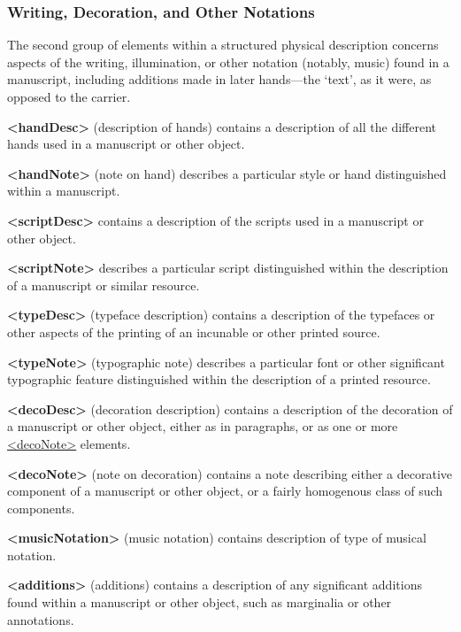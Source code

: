 \subsubsection[{Writing, Decoration, and Other Notations}]{Writing, Decoration, and Other Notations}\label{msph2}\par
The second group of elements within a structured physical description concerns aspects of the writing, illumination, or other notation (notably, music) found in a manuscript, including additions made in later hands—the ‘text’, as it were, as opposed to the carrier. 
\begin{sansreflist}
  
\item [\textbf{<handDesc>}] (description of hands) contains a description of all the different hands used in a manuscript or other object.
\item [\textbf{<handNote>}] (note on hand) describes a particular style or hand distinguished within a manuscript.
\item [\textbf{<scriptDesc>}] contains a description of the scripts used in a manuscript or other object.
\item [\textbf{<scriptNote>}] describes a particular script distinguished within the description of a manuscript or similar resource.
\item [\textbf{<typeDesc>}] (typeface description) contains a description of the typefaces or other aspects of the printing of an incunable or other printed source.
\item [\textbf{<typeNote>}] (typographic note) describes a particular font or other significant typographic feature distinguished within the description of a printed resource.
\item [\textbf{<decoDesc>}] (decoration description) contains a description of the decoration of a manuscript or other object, either as in paragraphs, or as one or more \hyperref[TEI.decoNote]{<decoNote>} elements.
\item [\textbf{<decoNote>}] (note on decoration) contains a note describing either a decorative component of a manuscript or other object, or a fairly homogenous class of such components.
\item [\textbf{<musicNotation>}] (music notation) contains description of type of musical notation.
\item [\textbf{<additions>}] (additions) contains a description of any significant additions found within a manuscript or other object, such as marginalia or other annotations.
\end{sansreflist}

